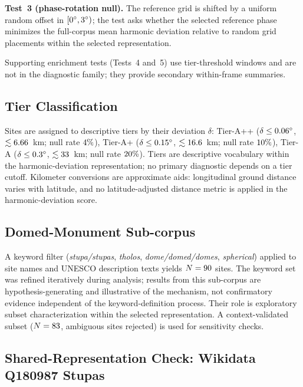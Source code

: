 \documentclass[12pt,a4paper]{article}
\newcommand{\degr}{\ifmmode{^\circ}\else\textdegree{}\fi}
\begin{document}
\textbf{Test~3 (phase-rotation null).} The reference grid is shifted by a
uniform random offset in $[0\degr{}, 3\degr{})$; the test asks whether
the selected reference phase minimizes the full-corpus mean harmonic deviation
relative to random grid placements within the selected representation.

Supporting enrichment tests (Tests~4 and~5) use tier-threshold windows and
are not in the diagnostic family; they provide secondary within-frame
summaries.

\subsection{Tier Classification}
\label{sec:tiers}

Sites are assigned to descriptive tiers by their deviation $\delta$:
Tier-A++ ($\delta \leq \AppThreshDeg\degr{}$, $\lesssim6.66$~km;
null rate $4\%$),
Tier-A+ ($\delta \leq \ApThreshDeg\degr{}$, $\lesssim16.6$~km;
null rate $10\%$),
Tier-A ($\delta \leq \ATierThreshDeg\degr{}$, $\lesssim33$~km;
null rate $20\%$).
Tiers are descriptive vocabulary within the harmonic-deviation representation;
no primary diagnostic depends on a tier cutoff.
Kilometer conversions are approximate aids: longitudinal ground distance
varies with latitude, and no latitude-adjusted distance metric is applied in
the harmonic-deviation score.

\subsection{Domed-Monument Sub-corpus}
\label{sec:dome_subset}

A keyword filter (\textit{stupa/stupas}, \textit{tholos},
\textit{dome/domed/domes}, \textit{spherical}) applied to site names and
UNESCO description texts yields $N = 90$ sites. The keyword set was
refined iteratively during analysis; results from this sub-corpus are
hypothesis-generating and illustrative of the mechanism, not confirmatory
evidence independent of the keyword-definition process. Their role is
exploratory subset characterization within the selected representation. A
context-validated subset
($N = 83$, \NcircContextRejected{} ambiguous sites rejected)
is used for sensitivity checks.

\subsection{Shared-Representation Check: Wikidata Q180987 Stupas}
\end{document}
